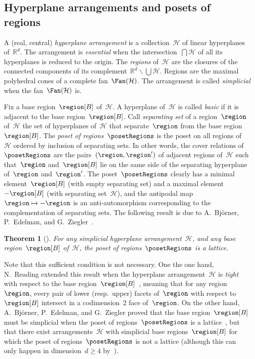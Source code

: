 \documentclass{amsart}
\newtheorem{theorem}{Theorem}%
\theoremstyle{definition}
\newcommand{\R}{\mathbb{R}} %
\newcommand{\ssm}{\smallsetminus} %
\newcommand{\darkblue}{\color{darkblue}} %
\newcommand{\defn}[1]{\textsl{\darkblue #1}} %
\newcommand{\arrangement}{\mathcal{H}} %
\begin{document}
\subsection{Hyperplane arrangements and posets of regions}
\label{subsec:posetRegions}

A (real, central) \defn{hyperplane arrangement} is a collection~$\arrangement$ of linear hyperplanes of~$\R^d$.
The arrangement is \defn{essential} when the intersection~$\bigcap \arrangement$ of all its hyperplanes is reduced to the origin.
The \defn{regions} of~$\arrangement$ are the closures of the connected components of its complement~$\R^d \ssm \bigcup \arrangement$.
Regions are the maximal polyhedral cones of a complete fan~$\Fan(\arrangement)$.
The arrangement is called \defn{simplicial} when the fan~$\Fan(\arrangement)$ is.

Fix a base region~$\region[B]$ of~$\arrangement$.
A hyperplane of~$\arrangement$ is called \defn{basic} if it is adjacent to the base region~$\region[B]$.
Call \defn{separating set} of a region~$\region$ of~$\arrangement$ the set of hyperplanes of~$\arrangement$ that separate~$\region$ from the base region~$\region[B]$.
The \defn{poset of regions}~$\posetRegions$ is the poset on all regions of~$\arrangement$ ordered by inclusion of separating sets.
In other words, the cover relations of~$\posetRegions$ are the pairs~$(\region, \region')$ of adjacent regions of~$\arrangement$ such that~$\region$ and~$\region[B]$ lie on the same side of the separating hyperplane of~$\region$ and~$\region'$.
The poset~$\posetRegions$ clearly has a minimal element~$\region[B]$ (with empty separating set) and a maximal element~$-\region[B]$ (with separating set~$\arrangement$), and the antipodal map~$\region \mapsto -\region$ is an anti-automorphism corresponding to the complementation of separating sets.
The following result is due to A.~Bj\"orner, P.~Edelman, and G.~Ziegler~\cite{BjornerEdelmanZiegler}.

\begin{theorem}[{\cite[Thm.~3.4]{BjornerEdelmanZiegler}}]
For any simplicial hyperplane arrangement~$\arrangement$, and any base region~$\region[B]$ of~$\arrangement$, the poset of regions~$\posetRegions$ is a lattice.
\end{theorem}

Note that this sufficient condition is not necessary.
One the one hand, N.~Reading extended this result when the hyperplane arrangement~$\arrangement$ is \defn{tight} with respect to the base region~$\region[B]$~\cite[Thm.~9.3.2]{Reading-PosetRegionsChapter}, meaning that for any region~$\region$, every pair of lower (resp.~upper) facets of~$\region$ with respect to~$\region[B]$ intersect in a codimension~$2$ face of~$\region$.
On the other hand, A.~Bj\"orner, P.~Edelman, and G.~Ziegler proved that the base region~$\region[B]$ must be simplicial when the poset of regions~$\posetRegions$ is a lattice~\cite[Thm.~3.1]{BjornerEdelmanZiegler}, but that there exist arrangements~$\arrangement$ with simplicial base regions~$\region[B]$ for which the poset of regions~$\posetRegions$ is not a lattice (although this can only happen in dimension~${d \ge 4}$ by~\cite[Thm.~3.2]{BjornerEdelmanZiegler}).
\end{document}
